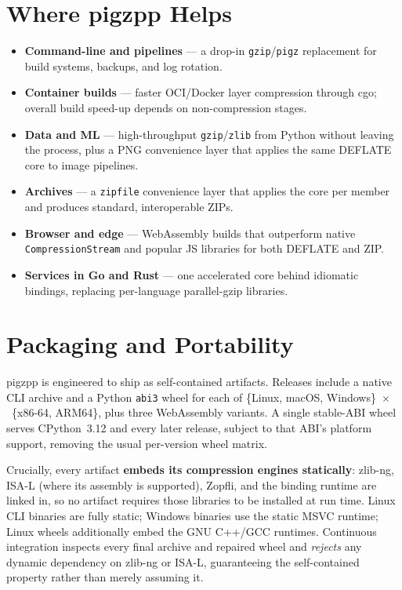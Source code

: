 \documentclass{pigzpp-whitepaper}
\begin{document}
\section{Where pigzpp Helps}
\begin{itemize}
  \item \textbf{Command-line and pipelines} --- a drop-in \texttt{gzip}\slash\texttt{pigz}
  replacement for build systems, backups, and log rotation.
  \item \textbf{Container builds} --- faster OCI/Docker layer compression through
  cgo; overall build speed-up depends on non-compression stages.
  \item \textbf{Data and ML} --- high-throughput \texttt{gzip}\slash\texttt{zlib}
  from Python without leaving the process, plus a PNG convenience layer that
  applies the same DEFLATE core to image pipelines.
  \item \textbf{Archives} --- a \texttt{zipfile} convenience layer that applies
  the core per member and produces standard, interoperable ZIPs.
  \item \textbf{Browser and edge} --- WebAssembly builds that outperform native
  \texttt{CompressionStream} and popular JS libraries for both DEFLATE and ZIP.
  \item \textbf{Services in Go and Rust} --- one accelerated core behind idiomatic
  bindings, replacing per-language parallel-gzip libraries.
\end{itemize}

\section{Packaging and Portability}
pigzpp is engineered to ship as self-contained artifacts. Releases include a
native CLI archive and a Python \texttt{abi3} wheel for each of
\{Linux, macOS, Windows\}~$\times$~\{x86-64, ARM64\}, plus three WebAssembly
variants. A single stable-ABI wheel serves CPython~3.12 and every later release,
subject to that ABI's platform support, removing the usual per-version wheel
matrix.

Crucially, every artifact \textbf{embeds its compression engines statically}:
zlib-ng, ISA-L (where its assembly is supported), Zopfli, and the binding runtime
are linked in, so no artifact requires those libraries to be installed at run
time. Linux CLI binaries are fully static; Windows binaries use the static MSVC
runtime; Linux wheels additionally embed the GNU C++/GCC runtimes. Continuous
integration inspects every final archive and repaired wheel and \emph{rejects}
any dynamic dependency on zlib-ng or ISA-L, guaranteeing the self-contained
property rather than merely assuming it.
\end{document}
